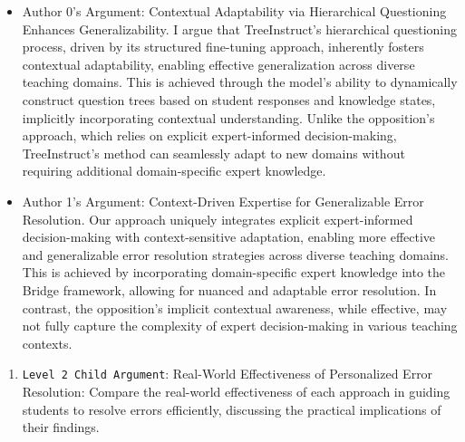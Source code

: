 \begin{enumerate}
\begin{enumerate}
        \begin{itemize}
            \item Author 0's Argument: Contextual Adaptability via Hierarchical Questioning Enhances Generalizability. I argue that TreeInstruct's hierarchical questioning process, driven by its structured fine-tuning approach, inherently fosters contextual adaptability, enabling effective generalization across diverse teaching domains. This is achieved through the model's ability to dynamically construct question trees based on student responses and knowledge states, implicitly incorporating contextual understanding. Unlike the opposition's approach, which relies on explicit expert-informed decision-making, TreeInstruct's method can seamlessly adapt to new domains without requiring additional domain-specific expert knowledge.
		\item Author 1's Argument: Context-Driven Expertise for Generalizable Error Resolution. Our approach uniquely integrates explicit expert-informed decision-making with context-sensitive adaptation, enabling more effective and generalizable error resolution strategies across diverse teaching domains. This is achieved by incorporating domain-specific expert knowledge into the Bridge framework, allowing for nuanced and adaptable error resolution. In contrast, the opposition's implicit contextual awareness, while effective, may not fully capture the complexity of expert decision-making in various teaching contexts.
        \end{itemize}
    \end{enumerate}

    \begin{enumerate}
        \item \texttt{Level 2 Child Argument}: Real-World Effectiveness of Personalized Error Resolution: Compare the real-world effectiveness of each approach in guiding students to resolve errors efficiently, discussing the practical implications of their findings.


\end{enumerate}
\end{enumerate}
